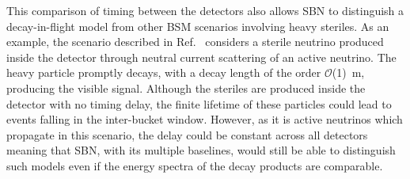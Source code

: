 \documentclass[11pt, a4paper]{article}
\newcommand{\refref}[1]{Ref.~\cite{#1}}
\begin{document}
This comparison of timing between the detectors also allows SBN to distinguish
a decay-in-flight model from other BSM scenarios involving heavy steriles. As an
example, the scenario described in \refref{Gninenko:2009ks,Gninenko:2010pr}
considers a sterile neutrino produced inside the detector through neutral
current scattering of an active neutrino. The heavy particle promptly
decays, with a decay length of the order $\mathcal{O}$(1)~m, producing the
visible signal. Although the steriles are produced inside the detector with no
timing delay, the finite lifetime of these particles could lead to events
falling in the inter-bucket window. However, as it is active neutrinos which propagate in this scenario, the delay could be constant
across all detectors meaning that SBN, with its multiple baselines, would still
be able to distinguish such models even if the energy spectra of the decay
products are comparable.
\end{document}
